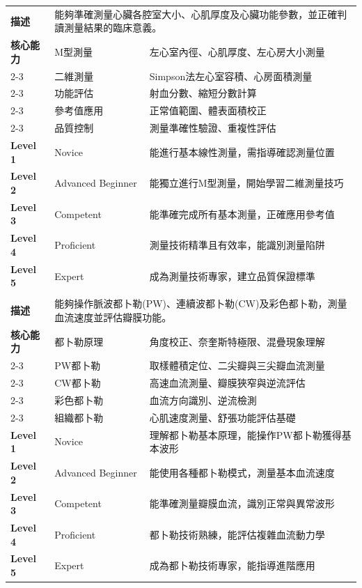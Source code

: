 \documentclass[12pt,a4paper]{article}
\begin{document}
\begin{longtable}{|p{1.5cm}|p{4cm}|p{8.5cm}|}
\rowcolor{emergency_red!10}
\multicolumn{3}{|c|}{\textbf{EPA 2: 心臟結構測量與評估}} \\
\hline
\textbf{描述} & \multicolumn{2}{|p{12.5cm}|}{能夠準確測量心臟各腔室大小、心肌厚度及心臟功能參數，並正確判讀測量結果的臨床意義。} \\
\hline
\textbf{核心能力} & M型測量 & 左心室內徑、心肌厚度、左心房大小測量 \\
\cline{2-3}
& 二維測量 & Simpson法左心室容積、心房面積測量 \\
\cline{2-3}
& 功能評估 & 射血分數、縮短分數計算 \\
\cline{2-3}
& 參考值應用 & 正常值範圍、體表面積校正 \\
\cline{2-3}
& 品質控制 & 測量準確性驗證、重複性評估 \\
\hline
\textbf{Level 1} & Novice & 能進行基本線性測量，需指導確認測量位置 \\
\hline
\textbf{Level 2} & Advanced Beginner & 能獨立進行M型測量，開始學習二維測量技巧 \\
\hline
\textbf{Level 3} & Competent & 能準確完成所有基本測量，正確應用參考值 \\
\hline
\textbf{Level 4} & Proficient & 測量技術精準且有效率，能識別測量陷阱 \\
\hline
\textbf{Level 5} & Expert & 成為測量技術專家，建立品質保證標準 \\
\hline

\rowcolor{emergency_red!10}
\multicolumn{3}{|c|}{\textbf{EPA 3: 都卜勒超音波基礎操作}} \\
\hline
\textbf{描述} & \multicolumn{2}{|p{12.5cm}|}{能夠操作脈波都卜勒(PW)、連續波都卜勒(CW)及彩色都卜勒，測量血流速度並評估瓣膜功能。} \\
\hline
\textbf{核心能力} & 都卜勒原理 & 角度校正、奈奎斯特極限、混疊現象理解 \\
\cline{2-3}
& PW都卜勒 & 取樣體積定位、二尖瓣與三尖瓣血流測量 \\
\cline{2-3}
& CW都卜勒 & 高速血流測量、瓣膜狹窄與逆流評估 \\
\cline{2-3}
& 彩色都卜勒 & 血流方向識別、逆流檢測 \\
\cline{2-3}
& 組織都卜勒 & 心肌速度測量、舒張功能評估基礎 \\
\hline
\textbf{Level 1} & Novice & 理解都卜勒基本原理，能操作PW都卜勒獲得基本波形 \\
\hline
\textbf{Level 2} & Advanced Beginner & 能使用各種都卜勒模式，測量基本血流速度 \\
\hline
\textbf{Level 3} & Competent & 能準確測量瓣膜血流，識別正常與異常波形 \\
\hline
\textbf{Level 4} & Proficient & 都卜勒技術熟練，能評估複雜血流動力學 \\
\hline
\textbf{Level 5} & Expert & 成為都卜勒技術專家，能指導進階應用 \\
\hline


\end{longtable}
\end{document}
